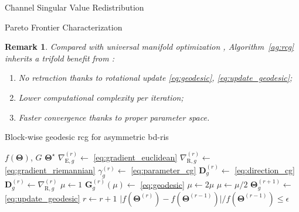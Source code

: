 \documentclass[journal]{IEEEtran}
\makeatletter
\newtheorem{remark}{Remark}
\newcommand\setalgorithmcaptionfont[1]{%
	\let\my@floatc@ruled\floatc@ruled          %
	\def\floatc@ruled{%
		\global\let\floatc@ruled\my@floatc@ruled %
		#1\floatc@ruled}}
\makeatother
\begin{document}
\begin{section}{Channel Singular Value Redistribution}
\begin{subsection}{Pareto Frontier Characterization}
		\begin{remark}
			Compared with universal manifold optimization \cite{Absil2009,Pan2022d}, Algorithm~\ref{ag:rcg} inherits a trifold benefit from \cite{Abrudan2008,Abrudan2009}:
			\begin{enumerate}
				\item No retraction thanks to rotational update \eqref{eq:geodesic}, \eqref{eq:update_geodesic};
				\item Lower computational complexity per iteration;
				\item Faster convergence thanks to proper parameter space.
			\end{enumerate}
		\end{remark}

		\setalgorithmcaptionfont{\small}
		\begin{algorithm}[!t]
			\small
			\caption{Block-wise geodesic \gls{rcg} for asymmetric \gls{bd}-\gls{ris}}
			\label{ag:rcg}
			\begin{algorithmic}[1]
				\Require $f(\mathbf{\Theta})$, $G$
				\Ensure $\mathbf{\Theta}^\star$
				\Repeat
						\State $\nabla_{\mathrm{E},g}^{(r)} \gets$ \eqref{eq:gradient_euclidean} \label{ln:gradient_euclidean}
						\State $\nabla_{\mathrm{R},g}^{(r)} \gets$ \eqref{eq:gradient_riemannian}
						\State $\gamma_g^{(r)} \gets$ \eqref{eq:parameter_cg}
						\State $\mathbf{D}_g^{(r)} \gets$ \eqref{eq:direction_cg}
						 
							\State $\mathbf{D}_g^{(r)} \gets \nabla_{\mathrm{R},g}^{(r)}$
						\EndIf
						\State $\mu \gets 1$
						\State $\mathbf{G}_g^{(r)}(\mu) \gets$ \eqref{eq:geodesic}
							\State $\mu \gets 2 \mu$
						\EndWhile
							\State $\mu \gets \mu / 2$
						\EndWhile
						\State $\mathbf{\Theta}_g^{(r+1)} \gets$ \eqref{eq:update_geodesic}
					\EndFor
					\State $r \gets r+1$
				\Until $\lvert f(\mathbf{\Theta}^{(r)}) - f(\mathbf{\Theta}^{(r-1)}) \rvert / f(\mathbf{\Theta}^{(r-1)}) \le \epsilon$
			\end{algorithmic}
		\end{algorithm}


\end{subsection}
\end{section}
\end{document}
